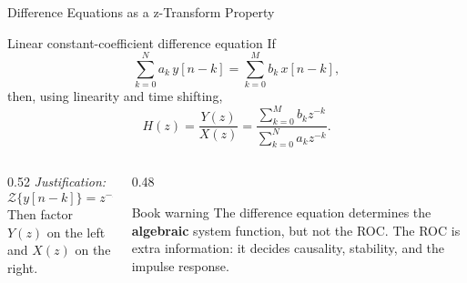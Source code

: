 \begin{frame}[t]{Difference Equations as a z-Transform Property}
  \small
  \begin{conceptbox}{Linear constant-coefficient difference equation}
    If
    \[
      \sum_{k=0}^{N} a_k\,y[n-k]
      =
      \sum_{k=0}^{M} b_k\,x[n-k],
    \]
    then, using linearity and time shifting,
    \[
      H(z)=\frac{Y(z)}{X(z)}
      =
      \frac{\sum_{k=0}^{M} b_k z^{-k}}
      {\sum_{k=0}^{N} a_k z^{-k}}.
    \]
  \end{conceptbox}

  \begin{columns}[T]
    \begin{column}{0.52\textwidth}
      \textit{Justification:}
      \[
        \mathcal{Z}\{y[n-k]\}=z^{-k}Y(z),
        \qquad
        \mathcal{Z}\{x[n-k]\}=z^{-k}X(z).
      \]
      Then factor $Y(z)$ on the left and $X(z)$ on the right.
    \end{column}
    \begin{column}{0.48\textwidth}
      \begin{insightbox}{Book warning}
        The difference equation determines the \textbf{algebraic} system function,
        but not the ROC. The ROC is extra information: it decides causality,
        stability, and the impulse response.
      \end{insightbox}
    \end{column}
  \end{columns}
\end{frame}


